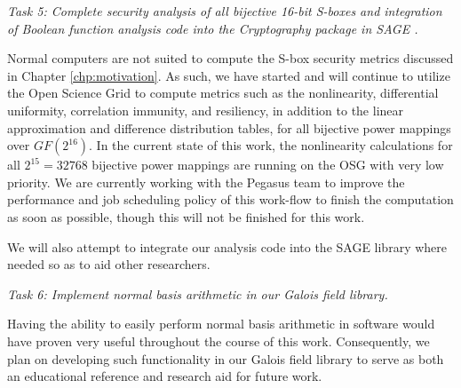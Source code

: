 \vspace*{1em}
\begin{minipage}{.9\textwidth}
  \emph{Task 5: Complete security analysis of all bijective 16-bit S-boxes and integration of Boolean function analysis code into the Cryptography package in SAGE \cite{SAGE}.}
\end{minipage}
\vspace*{1em}

Normal computers are not suited to compute the S-box security metrics discussed in Chapter \ref{chp:motivation}. As such, we have started and will continue to utilize the Open Science Grid to compute metrics such as the nonlinearity, differential uniformity, correlation immunity, and resiliency, in addition to the linear approximation and difference distribution tables, for all bijective power mappings over $GF(2^{16})$. In the current state of this work, the nonlinearity calculations for all $2^{15} = 32768$ bijective power mappings are running on the OSG with very low priority. We are currently working with the Pegasus team to improve the performance and job scheduling policy of this work-flow to finish the computation as soon as possible, though this will not be finished for this work. 

We will also attempt to integrate our analysis code into the SAGE library where needed so as to aid other researchers.

\begin{minipage}{.9\textwidth}
  \emph{Task 6: Implement normal basis arithmetic in our Galois field library.}
\end{minipage}

Having the ability to easily perform normal basis arithmetic in software would have proven very useful throughout the course of this work. Consequently, we plan on developing such functionality in our Galois field library to serve as both an educational reference and research aid for future work.


